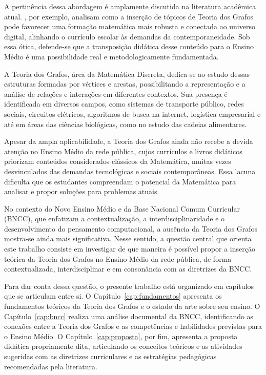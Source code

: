 \documentclass[
  12pt,
  oneside,
  a4paper,
  english,
  brazilian
  ]{abntex2}
\theoremstyle{definition}
\begin{document}
A pertinência dessa abordagem é amplamente discutida na literatura acadêmica
atual. \textcite{rodrigues2021}, por exemplo, analisam como a inserção de
tópicos de Teoria dos Grafos pode favorecer uma formação matemática mais robusta
e conectada ao universo digital, alinhando o currículo escolar às demandas da
contemporaneidade. Sob essa ótica, defende-se que a transposição didática desse
conteúdo para o Ensino Médio é uma possibilidade real e metodologicamente
fundamentada.

A Teoria dos Grafos, área da Matemática Discreta, dedica-se ao estudo dessas
estruturas formadas por vértices e arestas, possibilitando a representação e a
análise de relações e interações em diferentes contextos. Sua presença é
identificada em diversos campos, como sistemas de transporte público, redes
sociais, circuitos elétricos, algoritmos de busca na internet, logística
empresarial e até em áreas das ciências biológicas, como no estudo das cadeias
alimentares.

Apesar da ampla aplicabilidade, a Teoria dos Grafos ainda não recebe a devida
atenção no Ensino Médio da rede pública, cujos currículos e livros didáticos
priorizam conteúdos considerados clássicos da Matemática, muitas vezes
desvinculados das demandas tecnológicas e sociais contemporâneas. Essa lacuna
dificulta que os estudantes compreendam o potencial da Matemática para analisar e
propor soluções para problemas atuais.

No contexto do Novo Ensino Médio e da Base Nacional Comum Curricular (BNCC), que
enfatizam a contextualização, a interdisciplinaridade e o desenvolvimento do
pensamento computacional, a ausência da Teoria dos Grafos mostra-se ainda mais
significativa. Nesse sentido, a questão central que orienta este trabalho consiste
em investigar de que maneira é possível propor a inserção teórica da Teoria dos
Grafos no Ensino Médio da rede pública, de forma contextualizada, interdisciplinar
e em consonância com as diretrizes da BNCC.

Para dar conta dessa questão, o presente trabalho está organizado em capítulos
que se articulam entre si. O Capítulo~\ref{cap:fundamentos} apresenta os
fundamentos teóricos da Teoria dos Grafos e o estado da arte sobre seu ensino.
O Capítulo~\ref{cap:bncc} realiza uma análise documental da BNCC, identificando
as conexões entre a Teoria dos Grafos e as competências e habilidades previstas
para o Ensino Médio. O Capítulo~\ref{cap:proposta}, por fim, apresenta a proposta
didática propriamente dita, articulando os conceitos teóricos e as atividades
sugeridas com as diretrizes curriculares e as estratégias pedagógicas
recomendadas pela literatura.
\end{document}
